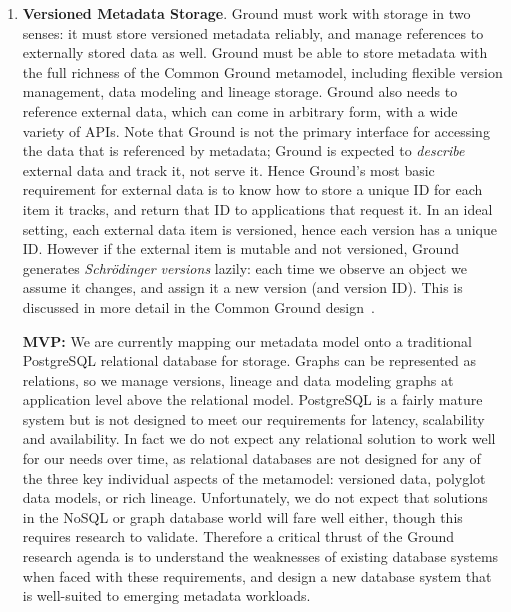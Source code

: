 \begin{enumerate}
\item \textbf{Versioned Metadata Storage}.  Ground must work with storage in two senses: it must store versioned metadata reliably, and manage references to externally stored data as well.  Ground must be able to store metadata with the full richness of the Common Ground metamodel, including flexible version management, data modeling and lineage storage.  Ground also needs to reference external data, which can come in arbitrary form, with a wide variety of APIs.  Note that Ground is not the primary interface for accessing the data that is referenced by metadata; Ground is expected to \emph{describe} external data and track it, not serve it.  Hence Ground's most basic requirement for external data is to know how to store a unique ID for each item it tracks, and return that ID to applications that request it.  In an ideal setting, each external data item is versioned, hence each version has a unique ID.  However if the external item is mutable and not versioned, Ground generates \emph{Schr\"{o}dinger versions} lazily: each time we observe an object we assume it changes, and assign it a new version (and version ID).  This is discussed in more detail in the Common Ground design~\cite{commonground}.

\textbf{MVP:} We are currently mapping our metadata model onto a traditional PostgreSQL relational database for storage.  Graphs can be represented as relations, so we manage versions, lineage and data modeling graphs at application level above the relational model.  PostgreSQL is a fairly mature system but is not designed to meet our requirements for latency, scalability and availability. In fact we do not expect any relational solution to work well for our needs over time, as relational databases are not designed for any of the three key individual aspects of the metamodel: versioned data, polyglot data models, or rich lineage.  Unfortunately, we do not expect that solutions in the NoSQL or graph database world will fare well either, though this requires research to validate. Therefore a critical thrust of the Ground research agenda is to understand the weaknesses of existing database systems when faced with these requirements, and design a new database system that is well-suited to emerging metadata workloads. 



\end{enumerate}

